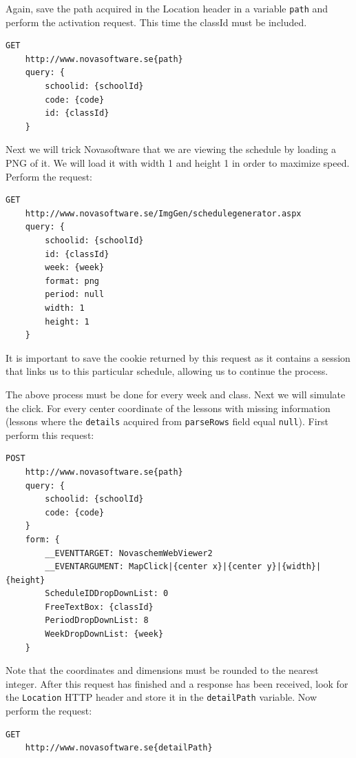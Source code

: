 \documentclass{article}
\begin{document}
	Again, save the path acquired in the Location header in a variable \texttt{path} and perform the activation request. This time the classId must be included.
	
	\begin{lstlisting}[language=HTTP, style=nonumbers]
	GET
	http://www.novasoftware.se{path}
	query: {
		schoolid: {schoolId}
		code: {code}
		id: {classId}
	}
	\end{lstlisting}
	
	Next we will trick Novasoftware that we are viewing the schedule by loading a PNG of it. We will load it with width 1 and height 1 in order to maximize speed. Perform the request:
	
	\begin{lstlisting}[language=HTTP, style=nonumbers]
	GET
	http://www.novasoftware.se/ImgGen/schedulegenerator.aspx
	query: {
		schoolid: {schoolId}
		id: {classId}
		week: {week}
		format: png
		period: null
		width: 1
		height: 1
	}
	\end{lstlisting}
	
	It is important to save the cookie returned by this request as it contains a session that links us to this particular schedule, allowing us to continue the process.
	
	The above process must be done for every week and class. Next we will simulate the click. For every center coordinate of the lessons with missing information (lessons where the \texttt{details} acquired from \texttt{parseRows} field equal \texttt{null}). First perform this request:
	
	\begin{lstlisting}[language=HTTP, style=nonumbers]
	POST
	http://www.novasoftware.se{path}
	query: {
		schoolid: {schoolId}
		code: {code}
	}
	form: {
		__EVENTTARGET: NovaschemWebViewer2
		__EVENTARGUMENT: MapClick|{center x}|{center y}|{width}|{height}
		ScheduleIDDropDownList: 0
		FreeTextBox: {classId}
		PeriodDropDownList: 8
		WeekDropDownList: {week}
	}
	\end{lstlisting}
	
	Note that the coordinates and dimensions must be rounded to the nearest integer. After this request has finished and a response has been received, look for the \texttt{Location} HTTP header and store it in the \texttt{detailPath} variable. Now perform the request:
	
	\begin{lstlisting}[language=HTTP, style=nonumbers]
	GET
	http://www.novasoftware.se{detailPath}
	\end{lstlisting}
	
\end{document}
